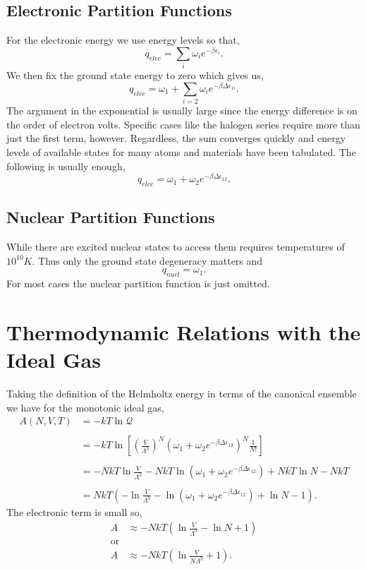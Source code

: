\subsection{Electronic Partition Functions}
For the electronic energy we use energy levels so that,
\begin{equation*}
	q_{elec} = \sum_i{\omega_i e^{-\beta \epsilon_i}}.
\end{equation*}
We then fix the ground state energy to zero which gives us,
\begin{equation*}
	q_{elec} = \omega_1 + \sum_{i=2}{\omega_i e^{-\beta \Delta\epsilon_{1i}}}.
\end{equation*}
The argument in the exponential is usually large since the energy difference is
on the order of electron volts. Specific cases like the halogen series require
more than just the first term, however. Regardless, the sum converges quickly
and energy levels of available states for many atoms and materials have been
tabulated. The following is usually enough,
\begin{equation*}
	q_{elec} = \omega_1 + \omega_2 e^{-\beta \Delta\epsilon_{12}}.
\end{equation*}

\subsection{Nuclear Partition Functions}
While there are excited nuclear states to access them requires temperatures of
$10^{10}K$. Thus only the ground state degeneracy matters and
\begin{equation*}
	q_{nucl} = \omega_1.
\end{equation*}
For most cases the nuclear partition function is just omitted.

\section{Thermodynamic Relations with the Ideal Gas}%
\label{sec:RIG}
Taking the definition of the Helmholtz energy in terms of the canonical ensemble
we have for the monotonic ideal gas,
\begin{align*}
	A(N,V,T) &= -kT\ln{\mathcal{Q}}\\
			 \quad\\
			 &= -kT\ln{\left[ \left(\frac{V}{\Lambda^{3}}\right)^N(\omega_1 +
			 \omega_2e^{-\beta\Delta\epsilon_{12}})^N \frac{1}{N!} \right]}\\
			 \quad\\
			 &= -NkT\ln{\frac{V}{\Lambda^{3}}} -NkT\ln{(\omega_1 +
			 \omega_2e^{-\beta\Delta\epsilon_{12}})} +NkT\ln{N} - NkT\\
			 \quad\\
			 &= NkT\left( -\ln{\frac{V}{\Lambda^{3}}} -\ln{(\omega_1 +
			 \omega_2e^{-\beta\Delta\epsilon_{12}})} +\ln{N} - 1 \right).
\end{align*}
The electronic term is small so,
\begin{align*}
	A &\approx -NkT\left(\ln{\frac{V}{\Lambda^{3}}} -\ln{N} + 1 \right)\\
	\text{or}\\
	A &\approx -NkT\left(\ln{\frac{V}{N\Lambda^{3}}} +1 \right).
\end{align*}

